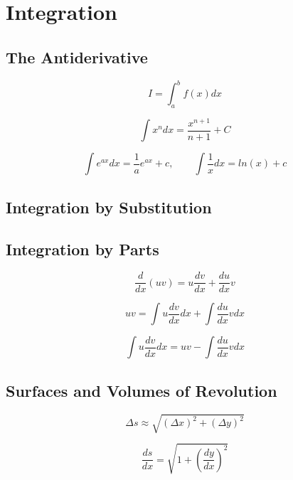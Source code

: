 \chapter{Integration}
\section{The Antiderivative}

\begin{equation*}
    I = \int_{a}^{b} f(x)dx
\end{equation*}

\begin{equation*}
    \int x^{n}dx = \frac{x^{n+1}}{n+1} + C
\end{equation*}

\[\int e^{ax}dx = \frac{1}{a}e^{ax} + c, \qquad \int \frac{1}{x}dx = ln(x) + c\]

\section{Integration by Substitution}
\section{Integration by Parts}

\begin{equation*}
    \frac{d}{dx}(uv) = u \frac{dv}{dx} + \frac{du}{dx} v
\end{equation*}

\begin{equation*}
    uv = \int u \frac{dv}{dx} dx + \int \frac{du}{dx}vdx
\end{equation*}
    
\begin{equation*}
    \int u \frac{dv}{dx} dx = uv - \int \frac{du}{dx}vdx
\end{equation*}

\section{Surfaces and Volumes of Revolution}

\begin{equation*}
    \Delta s \approx \sqrt{(\Delta x)^{2} + (\Delta y)^{2}}
\end{equation*}

\begin{equation*}
    \frac{ds}{dx} = \sqrt{1 + \left(\frac{dy}{dx}\right)^2}
\end{equation*}


